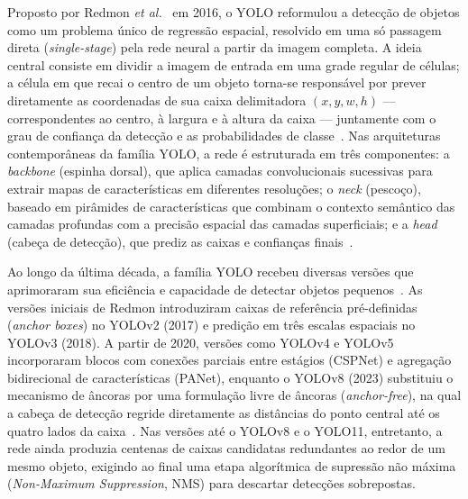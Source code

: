 Proposto por Redmon \textit{et al.}~\cite{redmon2016yolo} em 2016, o YOLO reformulou a detecção de objetos como um problema único de regressão espacial, resolvido em uma só passagem direta (\textit{single-stage}) pela rede neural a partir da imagem completa. A ideia central consiste em dividir a imagem de entrada em uma grade regular de células; a célula em que recai o centro de um objeto torna-se responsável por prever diretamente as coordenadas de sua caixa delimitadora $(x, y, w, h)$ --- correspondentes ao centro, à largura e à altura da caixa --- juntamente com o grau de confiança da detecção e as probabilidades de classe~\cite{redmon2016yolo}. Nas arquiteturas contemporâneas da família YOLO, a rede é estruturada em três componentes: a \textit{backbone} (espinha dorsal), que aplica camadas convolucionais sucessivas para extrair mapas de características em diferentes resoluções; o \textit{neck} (pescoço), baseado em pirâmides de características que combinam o contexto semântico das camadas profundas com a precisão espacial das camadas superficiais; e a \textit{head} (cabeça de detecção), que prediz as caixas e confianças finais~\cite{terven2023comprehensive}.

Ao longo da última década, a família YOLO recebeu diversas versões que aprimoraram sua eficiência e capacidade de detectar objetos pequenos~\cite{terven2023comprehensive}. As versões iniciais de Redmon introduziram caixas de referência pré-definidas (\textit{anchor boxes}) no YOLOv2 (2017) e predição em três escalas espaciais no YOLOv3 (2018). A partir de 2020, versões como YOLOv4 e YOLOv5 incorporaram blocos com conexões parciais entre estágios (CSPNet) e agregação bidirecional de características (PANet), enquanto o YOLOv8 (2023) substituiu o mecanismo de âncoras por uma formulação livre de âncoras (\textit{anchor-free}), na qual a cabeça de detecção regride diretamente as distâncias do ponto central até os quatro lados da caixa~\cite{terven2023comprehensive}. Nas versões até o YOLOv8 e o YOLO11, entretanto, a rede ainda produzia centenas de caixas candidatas redundantes ao redor de um mesmo objeto, exigindo ao final uma etapa algorítmica de supressão não máxima (\textit{Non-Maximum Suppression}, NMS) para descartar detecções sobrepostas.

